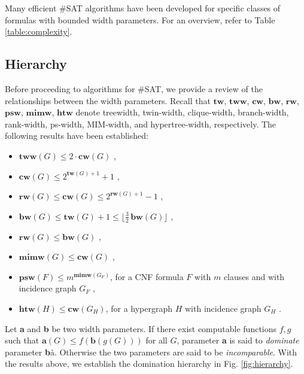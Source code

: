 \documentclass{article}
\begin{document}
Many efficient \#SAT algorithms have been developed for specific classes of formulas with bounded width parameters.
For an overview, refer to Table \ref{table:complexity}.

\subsection{Hierarchy}

Before proceeding to algorithms for \#SAT, we provide a review of the relationships between the width parameters.
Recall that $\mathbf{tw}$, $\mathbf{tww}$, $\mathbf{cw}$, $\mathbf{bw}$, $\mathbf{rw}$, $\mathbf{psw}$, $\mathbf{mimw}$, $\mathbf{htw}$ denote treewidth, twin-width, clique-width, branch-width, rank-width, ps-width, MIM-width, and hypertree-width, respectively.
The following results have been established:
\begin{itemize}[--]
	\item $\mathbf{tww}(G) \leq 2\cdot \mathbf{cw}(G)$ \cite{DBLP:conf/sat/GanianPSSS22},
	\item $\mathbf{cw}(G) \leq 2^{\mathbf{tw}(G)+1}+1$ \cite{DBLP:journals/dam/FischerMR08},
	\item $\mathbf{rw}(G) \leq \mathbf{cw}(G) \leq 2^{\mathbf{rw}(G)+1}-1$ \cite{DBLP:journals/fuin/GanianHO13},
	\item $\mathbf{bw}(G) \leq \mathbf{tw}(G) + 1 \leq \lfloor \frac{3}{2} \, \mathbf{bw}(G) \rfloor$ \cite{DBLP:journals/jct/RobertsonS91},
	\item $\mathbf{rw}(G) \leq \mathbf{bw}(G)$ \cite{DBLP:journals/fuin/GanianHO13},
	\item $\mathbf{mimw}(G) \leq \mathbf{cw}(G)$ \cite{DBLP:conf/sat/SaetherTV14},
	\item $\mathbf{psw}(F) \leq m^{\textbf{mimw}(G_F)}$, for a CNF formula $F$ with $m$ clauses and with incidence graph $G_F$ \cite{DBLP:conf/sat/SaetherTV14},
	\item $\mathbf{htw}(H) \leq \mathbf{cw}(G_H)$, for a hypergraph $H$ with incidence graph $G_H$ \cite{DBLP:journals/siamcomp/GottlobP04}.
\end{itemize}

\noindent
Let \textbf{a} and \textbf{b} be two width parameters.
If there exist computable functions $f,g$ such that $\mathbf{a}(G) \leq f(\mathbf{b}(g(G)))$ for all $G$, parameter \textbf{a} is said to {\em dominate} parameter \textbf{b}å.
Otherwise the two parameters are said to be {\em incomparable}.
With the results above, we establish the domination hierarchy in Fig. \ref{fig:hierarchy}.
\end{document}
